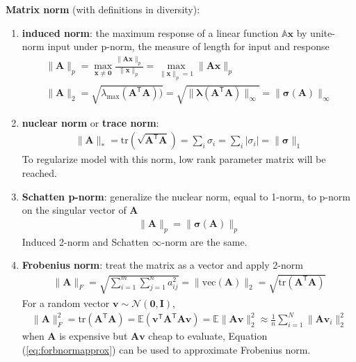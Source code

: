 \textbf{Matrix norm} (with definitions in diversity):
\begin{enumerate}[{(1)}]
    \item \textbf{induced norm}: 
    the maximum response of a linear function $\mathbb{A}\bm{x}$ by unite-norm input under p-norm, the measure of length for input and response 
    \begin{gather}
        \|\mathbf{A}\|_p
        = \max_{\bm{x}\neq\bm{0}}\frac{\|\mathbf{A}\bm{x}\|_p}{\|\bm{x}\|_p}
        = \max_{\|\bm{x}\|_p=1}\|\mathbf{A}\bm{x}\|_p\\
        \|\mathbf{A}\|_2
        = \sqrt{\lambda_{\text{max}}(\mathbf{A}^\mathsf{T}\mathbf{A}))}
        = \sqrt{\|\bm{\lambda}(\mathbf{A}^\mathsf{T}\mathbf{A})\|_\infty}
        = \|\bm{\sigma}(\mathbf{A})\|_\infty
    \end{gather}
    
    \item \textbf{nuclear norm} or \textbf{trace norm}: 
    \begin{gather}
        \|\mathbf{A}\|_*
        = \mathrm{tr}(\sqrt{\mathbf{A}^\mathsf{T}\mathbf{A}})
        = \sum_i\sigma_i
        = \sum_i|\sigma_i|
        = \|\bm{\sigma}\|_1
    \end{gather}
    To regularize model with this norm, low rank parameter matrix will be reached.
    
    \item \textbf{Schatten p-norm}: generalize the nuclear norm, 
    equal to 1-norm, to p-norm on the singular vector of $\mathbf{A}$
    \begin{gather}
        \|\mathbf{A}\|_p=\|\bm{\sigma}(\mathbf{A})\|_p
    \end{gather}
    Induced 2-norm and Schatten $\infty$-norm are the same.
    
    \item \textbf{Frobenius norm}: treat the matrix as a vector and apply 2-norm
    \begin{gather}
        \|\mathbf{A}\|_F
        = \sqrt{\sum_{i=1}^m\sum_{j=1}^n{a_{ij}^2}}
        = \|\mathrm{vec}(\mathbf{A})\|_2
        = \sqrt{\mathrm{tr}(\mathbf{A}^\mathsf{T}\mathbf{A})}
    \end{gather}
    For a random vector $\bm{v}\sim\mathcal{N}(\mathbf{0},\mathbf{I})$,
    \begin{gather}
        \|\mathbf{A}\|_F^2
        = \mathrm{tr}(\mathbf{A}^\mathsf{T}\mathbf{A})
        = \mathbb{E}(\bm{v}^\mathsf{T}\mathbf{A}^\mathsf{T}\mathbf{A}\bm{v})
        = \mathbb{E}\|\mathbf{A}\bm{v}\|_2^2
        \approx \frac{1}{n}\sum_{i=1}^N\|\mathbf{Av}_i\|_2^2 \label{eq:forbnormapprox}
    \end{gather}
    when $\mathbf{A}$ is expensive but $\mathbf{A}\bm{v}$ cheap to evaluate, 
    Equation (\ref{eq:forbnormapprox}) can be used to approximate Frobenius norm.
\end{enumerate}

